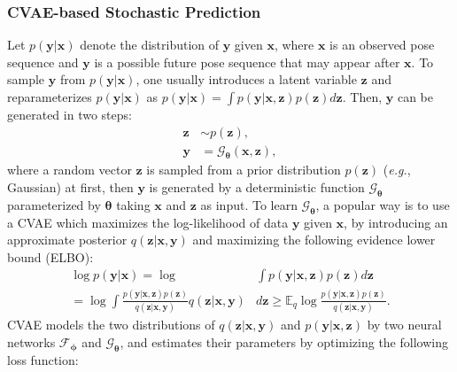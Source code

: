 \documentclass[sigconf,screen,nonacm]{acmart}
\begin{document}
	\subsubsection{CVAE-based Stochastic Prediction}
	Let $p(\mathbf{y}|\mathbf{x})$ denote the distribution of $\mathbf{y}$ given $\mathbf{x}$, where $\mathbf{x}$ is an observed pose sequence and $\mathbf{y}$ is a possible future pose sequence that may appear after $\mathbf{x}$. To sample $\mathbf{y}$ from $p(\mathbf{y}|\mathbf{x})$, one usually introduces a latent variable $\mathbf{z}$ and reparameterizes $p(\mathbf{y}|\mathbf{x})$ as $p(\mathbf{y}|\mathbf{x})=\int p(\mathbf{y}|\mathbf{x},\mathbf{z})p(\mathbf{z})d\mathbf{z}$. Then, $\mathbf{y}$ can be generated in two steps:
	\begin{equation}
		\label{eq:random-sampling}
		\begin{aligned}
			\mathbf{z} & \sim p(\mathbf{z}), \\
			\mathbf{y} & = \mathcal{G}_{\bm{\theta}}(\mathbf{x},\mathbf{z}),
		\end{aligned}
	\end{equation}
	where a random vector $\mathbf{z}$ is sampled from a prior distribution $p(\mathbf{z})$ (\textit{e.g.}, Gaussian) at first, then $\mathbf{y}$ is generated by a deterministic function $\mathcal{G}_{\bm{\theta}}$ parameterized by $\bm{\theta}$ taking $\mathbf{x}$ and $\mathbf{z}$ as input. To learn $\mathcal{G}_{\bm{\theta}}$, a popular way is to use a CVAE which maximizes the log-likelihood of data $\mathbf{y}$ given $\mathbf{x}$, by introducing an approximate posterior $q(\mathbf{z}|\mathbf{x},\mathbf{y})$ and maximizing the following evidence lower bound (ELBO):
	\begin{equation}
		\begin{aligned}
			\log p(\mathbf{y}|\mathbf{x}) =\log & \int p(\mathbf{y}|\mathbf{x},\mathbf{z})p(\mathbf{z})d\mathbf{z} \\
			=\log \int  \frac{p(\mathbf{y}|\mathbf{x},\mathbf{z})p(\mathbf{z})}{q(\mathbf{z}|\mathbf{x},\mathbf{y})} q(\mathbf{z}|\mathbf{x},\mathbf{y})& d\mathbf{z}
			\geq \mathbb{E}_{q} \log \frac{p(\mathbf{y}|\mathbf{x},\mathbf{z})p(\mathbf{z})}{q(\mathbf{z}|\mathbf{x},\mathbf{y})}.
		\end{aligned}
	\end{equation}
	CVAE models the two distributions of $q(\mathbf{z}|\mathbf{x},\mathbf{y})$ and $p(\mathbf{y}|\mathbf{x},\mathbf{z})$ by two neural networks $\mathcal{F}_{\bm{\phi}}$ and $\mathcal{G}_{\bm{\theta}}$, and estimates their parameters by optimizing the following loss function:
\end{document}
